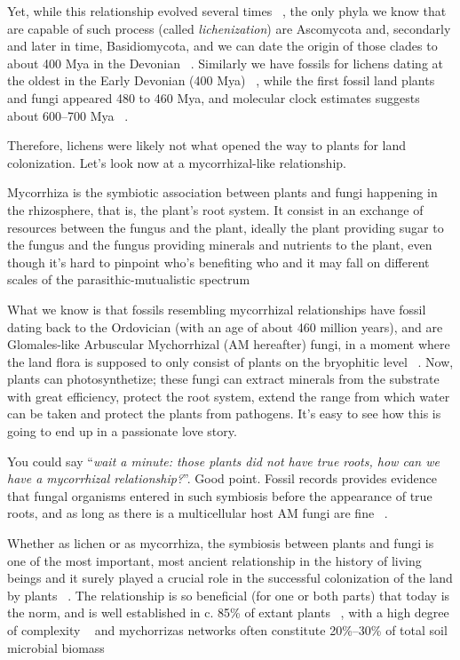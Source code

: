 Yet, while this relationship evolved several times ~\citep{gargas1995}, the only phyla we know that are capable of such process (called \emph{lichenization}) are Ascomycota and, secondarly and later in time, Basidiomycota, and we can date the origin of those clades to about 400 Mya in the Devonian ~\citep{berbee1993}. Similarly we have fossils for lichens dating at the oldest in the Early Devonian (400 Mya) ~\citep{taylor1997, honegger2013}, while the first fossil land plants and fungi appeared 480 to 460 Mya, and molecular clock estimates suggests about 600--700 Mya ~\citep{berbee1993, heckman2001}.

Therefore, lichens were likely not what opened the way to plants for land colonization. Let's look now at a mycorrhizal-like relationship.

Mycorrhiza is the symbiotic association between plants and fungi happening in the rhizosphere, that is, the plant's root system. It consist in an exchange of resources between the fungus and the plant, ideally the plant providing sugar to the fungus and the fungus providing minerals and nutrients to the plant, even though it's hard to pinpoint who's benefiting who and it may fall on different scales of the parasithic-mutualistic spectrum

What we know is that fossils resembling mycorrhizal relationships have fossil dating back to the Ordovician (with an age of about 460 million years), and are Glomales-like Arbuscular Mychorrhizal (AM hereafter) fungi, in a moment where the land flora is supposed to only consist of plants on the bryophitic level ~\citep{redecker2000}. Now, plants can photosynthetize; these fungi can extract minerals from the substrate with great efficiency, protect the root system, extend the range from which water can be taken and protect the plants from pathogens. It's easy to see how this is going to end up in a passionate love story.

You could say ``\emph{wait a minute: those plants did not have true roots, how can we have a mycorrhizal relationship?}''. Good point. Fossil records provides evidence that fungal organisms entered in such symbiosis before the appearance of true roots, and as long as there is a multicellular host AM fungi are fine ~\citep{wang2006, bonfante2008}.

Whether as lichen or as mycorrhiza, the symbiosis between plants and fungi is one of the most important, most ancient relationship in the history of living beings and it surely played a crucial role in the successful colonization of the land by plants ~\citep{pirozynski1975, malloch1980, harley1987, trappe1987, selosse1998, brundrett2002}. The relationship is so beneficial (for one or both parts) that today is the norm, and is well established in c. 85\% of extant plants ~\citep{cairney2000, strullu-derrien2018}, with a high degree of complexity ~\citep{heijden2015} and mychorrizas networks often constitute 20\%–30\% of total soil microbial biomass ~\citep{leake2011}

